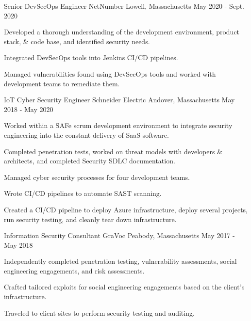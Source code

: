 \begin{cventries}
  \cventry
    {Senior DevSecOps Engineer} %
    {NetNumber} %
    {Lowell, Massachusetts} %
    {May 2020 - Sept. 2020} %
    {
      \begin{cvitems} %
        \item {
          Developed a thorough understanding of the development environment, product stack, \& code base, and identified security needs.
        }
        \item {
          Integrated DevSecOps tools into Jenkins CI/CD pipelines.
        }
        \item {
          Managed vulnerabilities found using DevSecOps tools and worked with development teams to remediate them.
        }
      \end{cvitems}
    }

  \cventry
    {IoT Cyber Security Engineer} %
    {Schneider Electric} %
    {Andover, Massachusetts} %
    {May 2018 - May 2020} %
    {
      \begin{cvitems} %
        \item {
          Worked within a SAFe scrum development environment to integrate security engineering into the constant delivery of SaaS software.
        }
        \item {
          Completed penetration tests, worked on threat models with developers \& architects, and completed Security SDLC documentation.
        }
        \item {
          Managed cyber security processes for four development teams.
        }
        \item {
          Wrote CI/CD pipelines to automate SAST scanning.
        }
        \item {
          Created a CI/CD pipeline to deploy Azure infrastructure, deploy several projects, run security testing, and cleanly tear down infrastructure.
        }
      \end{cvitems}
    }

  \cventry
    {Information Security Consultant} %
    {GraVoc} %
    {Peabody, Massachusetts} %
    {May 2017 - May 2018} %
    {
      \begin{cvitems} %
        \item {
          Independently completed penetration testing, vulnerability assessments, social engineering engagements, and risk assessments.
        }
        \item {
          Crafted tailored exploits for social engineering engagements based on the client's infrastructure.
        }
        \item {
          Traveled to client sites to perform security testing and auditing.
        }
      \end{cvitems}
    }


\end{cventries}
